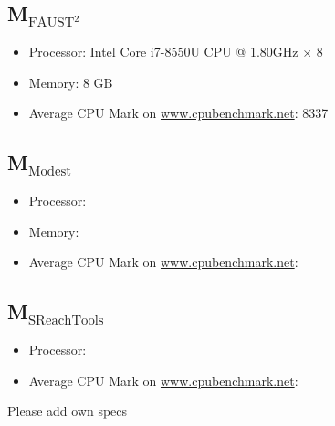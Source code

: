 \documentclass[EPiC]{easychair}
\newcommand{\todo}[1]{
  \begin{framed}
    \noindent{\bf TODO: }
    #1
  \end{framed}
}
\begin{document}
\subsection{M$_{\text{FAUST$^2$}}$} \label{sec:machine:faust2}
\begin{itemize}
 \item Processor: Intel Core i7-8550U CPU @ 1.80GHz $\times$ 8
 \item Memory: 8 GB
 \item Average CPU Mark on \url{www.cpubenchmark.net}: 8337
\end{itemize}

\subsection{M$_{\text{Modest}}$} \label{sec:machine:Modest}
\begin{itemize}
	\item Processor:  
    \item Memory: 
    \item Average CPU Mark on \url{www.cpubenchmark.net}: 
\end{itemize}

\subsection{M$_{\text{SReachTools}}$} \label{sec:machine:SReachTools}
\begin{itemize}
 \item Processor: 
 \item Average CPU Mark on \url{www.cpubenchmark.net}: 
\end{itemize}

\todo{Please add own specs}



\end{document}
